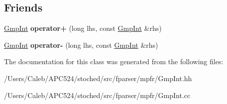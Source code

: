 \subsection*{Friends}
\begin{DoxyCompactItemize}
\item 
\mbox{\label{class_gmp_int_a117e36d20aff6d0d26e463af039d2bda}} 
\hyperlink{class_gmp_int}{Gmp\+Int} {\bfseries operator+} (long lhs, const \hyperlink{class_gmp_int}{Gmp\+Int} \&rhs)
\item 
\mbox{\label{class_gmp_int_a863edd8d21a0737273dbd203169060c0}} 
\hyperlink{class_gmp_int}{Gmp\+Int} {\bfseries operator-\/} (long lhs, const \hyperlink{class_gmp_int}{Gmp\+Int} \&rhs)
\end{DoxyCompactItemize}


The documentation for this class was generated from the following files\+:\begin{DoxyCompactItemize}
\item 
/\+Users/\+Caleb/\+A\+P\+C524/stoched/src/fparser/mpfr/Gmp\+Int.\+hh\item 
/\+Users/\+Caleb/\+A\+P\+C524/stoched/src/fparser/mpfr/Gmp\+Int.\+cc\end{DoxyCompactItemize}
